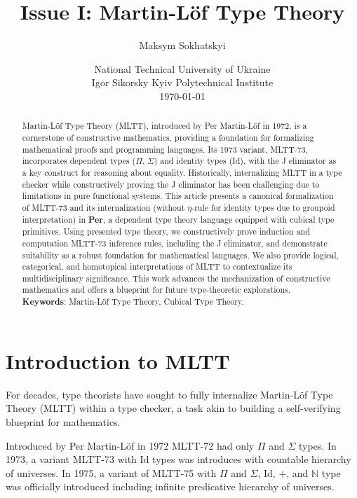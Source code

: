 \documentclass{article}
\begin{document}
\title  { Issue I: Martin-Löf Type Theory }
\author { Maksym Sokhatskyi }
\date   { National Technical University of Ukraine   \\ \small
          Igor Sikorsky Kyiv Polytechnical Institute \\ \today }

\maketitle

\begin{abstract}
Martin-Löf Type Theory (MLTT), introduced by Per Martin-Löf in 1972,
is a cornerstone of constructive mathematics, providing a foundation
for formalizing mathematical proofs and programming languages.
Its 1973 variant, MLTT-73, incorporates dependent types ($\Pi$, $\Sigma$)
and identity types (Id), with the J eliminator as a key construct for reasoning about equality.
Historically, internalizing MLTT in a type checker while constructively
proving the J eliminator has been challenging due to limitations in pure
functional systems. This article presents a canonical formalization of
MLTT-73 and its internalization (without $\eta$-rule for identity types due to groupoid interpretation)
in \textbf{Per}, a dependent type theory language equipped with cubical type primitives.
Using presented type theory, we constructively prove induction and computation MLTT-73 inference rules,
including the J eliminator, and demonstrate suitability as a robust foundation for mathematical languages.
We also provide logical, categorical, and homotopical interpretations of MLTT
to contextualize its multidisciplinary significance.
This work advances the mechanization of constructive mathematics and offers
a blueprint for future type-theoretic explorations. \\
\indent \textbf{Keywords}: Martin-Löf Type Theory, Cubical Type Theory.
\end{abstract}

\ifincludeTOC
  \tableofcontents
\fi

\newpage
\section*{Introduction to MLTT}

For decades, type theorists have sought to fully internalize
Martin-Löf Type Theory (MLTT) within a type checker, a task
akin to building a self-verifying blueprint for mathematics.

Introduced by Per Martin-Löf in 1972 \cite{Lof72} MLTT-72 had only $\Pi$ and $\Sigma$ types.
In 1973, a variant MLTT-73 with $\mathrm{Id}$ types was introduces with countable hierarchy of universes.
In 1975, a variant of MLTT-75 with $\Pi$ and $\Sigma$, $\mathrm{Id}$, $+$, and $\mathbb{N}$ type
was officially introduced \cite{Lof75} including infinite predicative hierarchy of universes.
\end{document}
